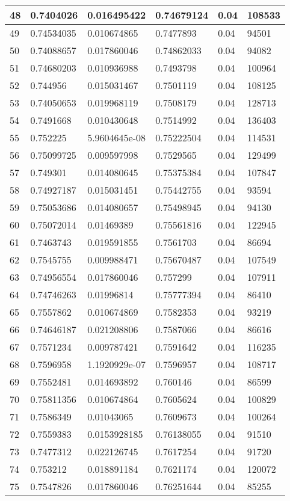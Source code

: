 \begin{longtable}{|l|l|l|l|l|l|}
48 & 0.7404026 & 0.016495422 & 0.74679124 & 0.04 & 108533 \\ \hline 
49 & 0.74534035 & 0.010674865 & 0.7477893 & 0.04 & 94501 \\ \hline 
50 & 0.74088657 & 0.017860046 & 0.74862033 & 0.04 & 94082 \\ \hline 
51 & 0.74680203 & 0.010936988 & 0.7493798 & 0.04 & 100964 \\ \hline 
52 & 0.744956 & 0.015031467 & 0.7501119 & 0.04 & 108125 \\ \hline 
53 & 0.74050653 & 0.019968119 & 0.7508179 & 0.04 & 128713 \\ \hline 
54 & 0.7491668 & 0.010430648 & 0.7514992 & 0.04 & 136403 \\ \hline 
55 & 0.752225 & 5.9604645e-08 & 0.75222504 & 0.04 & 114531 \\ \hline 
56 & 0.75099725 & 0.009597998 & 0.7529565 & 0.04 & 129499 \\ \hline 
57 & 0.749301 & 0.014080645 & 0.75375384 & 0.04 & 107847 \\ \hline 
58 & 0.74927187 & 0.015031451 & 0.75442755 & 0.04 & 93594 \\ \hline 
59 & 0.75053686 & 0.014080657 & 0.75498945 & 0.04 & 94130 \\ \hline 
60 & 0.75072014 & 0.01469389 & 0.75561816 & 0.04 & 122945 \\ \hline 
61 & 0.7463743 & 0.019591855 & 0.7561703 & 0.04 & 86694 \\ \hline 
62 & 0.7545755 & 0.009988471 & 0.75670487 & 0.04 & 107549 \\ \hline 
63 & 0.74956554 & 0.017860046 & 0.757299 & 0.04 & 107911 \\ \hline 
64 & 0.74746263 & 0.01996814 & 0.75777394 & 0.04 & 86410 \\ \hline 
65 & 0.7557862 & 0.010674869 & 0.7582353 & 0.04 & 93219 \\ \hline 
66 & 0.74646187 & 0.021208806 & 0.7587066 & 0.04 & 86616 \\ \hline 
67 & 0.7571234 & 0.009787421 & 0.7591642 & 0.04 & 116235 \\ \hline 
68 & 0.7596958 & 1.1920929e-07 & 0.7596957 & 0.04 & 108717 \\ \hline 
69 & 0.7552481 & 0.014693892 & 0.760146 & 0.04 & 86599 \\ \hline 
70 & 0.75811356 & 0.010674864 & 0.7605624 & 0.04 & 100829 \\ \hline 
71 & 0.7586349 & 0.01043065 & 0.7609673 & 0.04 & 100264 \\ \hline 
72 & 0.7559383 & 0.0153928185 & 0.76138055 & 0.04 & 91510 \\ \hline 
73 & 0.7477312 & 0.022126745 & 0.7617254 & 0.04 & 91720 \\ \hline 
74 & 0.753212 & 0.018891184 & 0.7621174 & 0.04 & 120072 \\ \hline 
75 & 0.7547826 & 0.017860046 & 0.76251644 & 0.04 & 85255 \\ \hline 
\end{longtable}